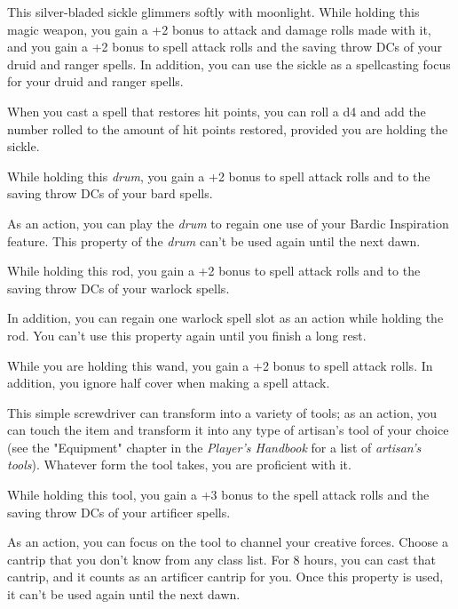 \documentclass[10pt,a4paper,twoside,bg=print,twocolumn,openany,nodeprecatedcode]{dndbook}
\begin{document}
This silver-bladed sickle glimmers softly with moonlight. While holding this magic weapon, you gain a +2 bonus to attack and damage rolls made with it, and you gain a +2 bonus to spell attack rolls and the saving throw DCs of your druid and ranger spells. In addition, you can use the sickle as a spellcasting focus for your druid and ranger spells.

When you cast a spell that restores hit points, you can roll a d4 and add the number rolled to the amount of hit points restored, provided you are holding the sickle.

While holding this \textit{drum}, you gain a +2 bonus to spell attack rolls and to the saving throw DCs of your bard spells.

As an action, you can play the \textit{drum} to regain one use of your Bardic Inspiration feature. This property of the \textit{drum} can't be used again until the next dawn.

While holding this rod, you gain a +2 bonus to spell attack rolls and to the saving throw DCs of your warlock spells.

In addition, you can regain one warlock spell slot as an action while holding the rod. You can't use this property again until you finish a long rest.

While you are holding this wand, you gain a +2 bonus to spell attack rolls. In addition, you ignore half cover when making a spell attack.

This simple screwdriver can transform into a variety of tools; as an action, you can touch the item and transform it into any type of artisan's tool of your choice (see the "Equipment" chapter in the \textit{Player's Handbook} for a list of \textit{artisan's tools}). Whatever form the tool takes, you are proficient with it.

While holding this tool, you gain a +3 bonus to the spell attack rolls and the saving throw DCs of your artificer spells.

As an action, you can focus on the tool to channel your creative forces. Choose a cantrip that you don't know from any class list. For 8 hours, you can cast that cantrip, and it counts as an artificer cantrip for you. Once this property is used, it can't be used again until the next dawn.
\end{document}
